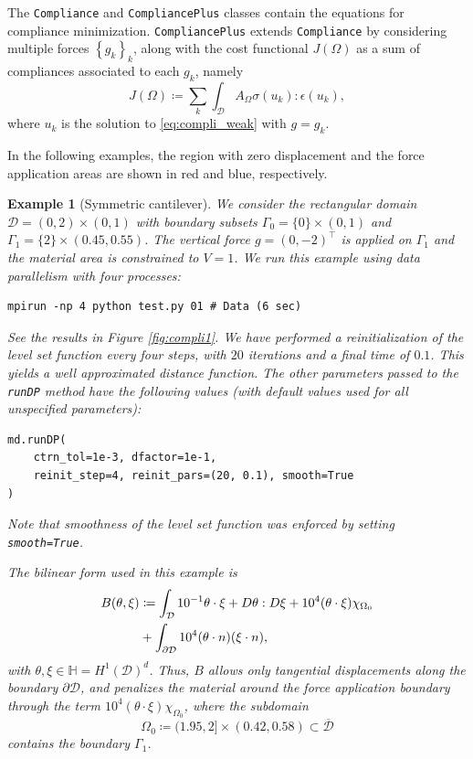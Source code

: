 \documentclass[iicol,pdflatex,sn-mathphys-ay]{sn-jnl}%
\theoremstyle{thmstyleone}%
\theoremstyle{thmstyletwo}%
\newtheorem{example}{Example}%
\theoremstyle{thmstylethree}%
\begin{document}
The \texttt{Compliance} and \texttt{CompliancePlus} classes
contain the equations for compliance minimization.
\texttt{CompliancePlus} extends \texttt{Compliance} by considering
multiple forces $\left\{g_k\right\}_k$, along with
the cost functional $J(\Omega)$ as a sum of compliances associated to each $g_k$, namely
\begin{equation} \label{eq:compli_plus}
	J(\Omega) \coloneqq \sum_{k} \int_{\mathcal{D}} A_{\Omega}\sigma(u_k):\epsilon(u_k),
\end{equation}
where $u_k$ is the solution to \eqref{eq:compli_weak} with $g=g_k$.

In the following examples, the region with zero displacement and
the force application areas are shown in red and blue, respectively.

\begin{example}[Symmetric cantilever]\label{ex:compli1}
We consider the rectangular domain $\mathcal{D} = (0, 2)\times(0, 1)$
with boundary subsets $\Gamma_0 = \{0\} \times (0, 1)$
and $\Gamma_1 = \{2\} \times (0.45,0.55)$.
The vertical force $g = (0, -2)^\top$ is applied on $\Gamma_1$ and
the material area is constrained to $V = 1$.
We run this example using data parallelism with four processes:
\begin{lstlisting}
mpirun -np 4 python test.py 01 # Data (6 sec)
\end{lstlisting}
See the results in Figure \ref{fig:compli1}. 
We have performed a reinitialization of the level set function
every four steps, with $20$ iterations and a final time of $0.1$.
This yields a well approximated distance function.
The other parameters passed to the \texttt{runDP} method
have the following values
(with default values used for all unspecified parameters): 
\begin{lstlisting}
md.runDP(
	ctrn_tol=1e-3, dfactor=1e-1,
	reinit_step=4, reinit_pars=(20, 0.1), smooth=True
)
\end{lstlisting} 
Note that smoothness of the level set function was enforced by setting \texttt{smooth=True}.

The bilinear form used in this example is
\begin{align}
\notag B(\theta, \xi) &\coloneqq \int_{\mathcal{D}} {10}^{-1}\theta \cdot \xi + D\theta :D\xi+{10}^4(\theta\cdot\xi)\chi_{\Omega_0}\\
\label{eq:compli1_bili}		   &+ \int_{\partial\mathcal{D}} {10}^4 (\theta \cdot n)(\xi \cdot n),
\end{align}	
with $\theta, \xi \in \mathbb{H} = H^1(\mathcal{D})^d$. Thus, $B$
allows only tangential displacements along the boundary $\partial \mathcal{D}$, and
penalizes the material around the force application boundary through the term ${10}^4(\theta\cdot\xi)\chi_{\Omega_0}$, where
the subdomain
\[
\Omega_0 \coloneqq (1.95,2]\times (0.42, 0.58) \subset \overline{\mathcal{D}}
\]
contains the boundary $\Gamma_1$.
\end{example}
\end{document}
